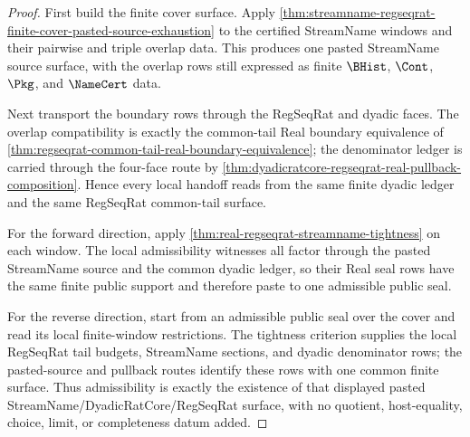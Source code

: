 \begin{proof}
First build the finite cover surface. Apply \autoref{thm:streamname-regseqrat-finite-cover-pasted-source-exhaustion} to the certified StreamName windows and their pairwise and triple overlap data. This produces one pasted StreamName source surface, with the overlap rows still expressed as finite $\BHist$, $\Cont$, $\Pkg$, and $\NameCert$ data.

Next transport the boundary rows through the RegSeqRat and dyadic faces. The overlap compatibility is exactly the common-tail Real boundary equivalence of \autoref{thm:regseqrat-common-tail-real-boundary-equivalence}; the denominator ledger is carried through the four-face route by \autoref{thm:dyadicratcore-regseqrat-real-pullback-composition}. Hence every local handoff reads from the same finite dyadic ledger and the same RegSeqRat common-tail surface.

For the forward direction, apply \autoref{thm:real-regseqrat-streamname-tightness} on each window. The local admissibility witnesses all factor through the pasted StreamName source and the common dyadic ledger, so their Real seal rows have the same finite public support and therefore paste to one admissible public seal.

For the reverse direction, start from an admissible public seal over the cover and read its local finite-window restrictions. The tightness criterion supplies the local RegSeqRat tail budgets, StreamName sections, and dyadic denominator rows; the pasted-source and pullback routes identify these rows with one common finite surface. Thus admissibility is exactly the existence of that displayed pasted StreamName/DyadicRatCore/RegSeqRat surface, with no quotient, host-equality, choice, limit, or completeness datum added.
\end{proof}

